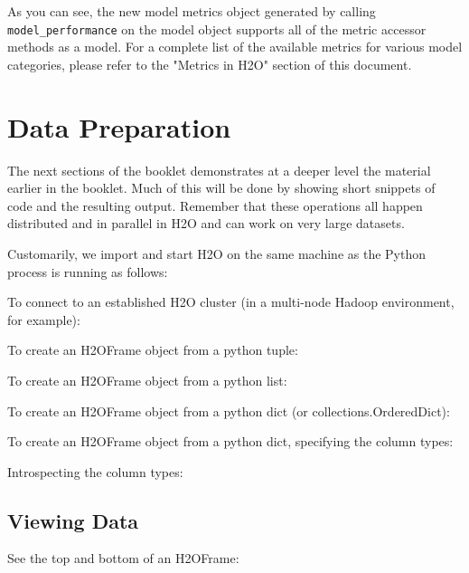 As you can see, the new model metrics object generated by calling \texttt{model\_performance} on the model object supports all of the metric accessor methods as a model. For a complete list of the available metrics for various model categories, please refer to the "Metrics in H2O" section of this document.

\section{Data Preparation}
The next sections of the booklet demonstrates at a deeper level the material earlier
in the booklet.  Much of this will be done by showing short snippets of code and the
resulting output.  Remember that these operations all happen distributed and in
parallel in H2O and can work on very large datasets.

Customarily, we import and start H2O on the same machine as the Python process is running as follows:


To connect to an established H2O cluster (in a multi-node Hadoop environment, for example):


To create an H2OFrame object from a python tuple:


To create an H2OFrame object from a python list:


To create an H2OFrame object from a python dict (or collections.OrderedDict):


To create an H2OFrame object from a python dict, specifying the column types:


Introspecting the column types:


\subsection{Viewing Data}
See the top and bottom of an H2OFrame:



